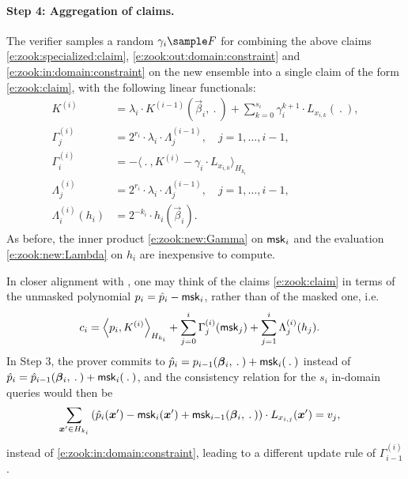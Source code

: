 \paragraph{Step 4: Aggregation of claims.}

The verifier samples a random $\gamma_i\sample F$ for combining the above claims \eqref{e:zook:specialized:claim}, \eqref{e:zook:out:domain:constraint} and \eqref{e:zook:in:domain:constraint} on the new ensemble into a single claim of the form \eqref{e:zook:claim}, with the following linear functionals:
\begin{align}
\label{e:zook:update:K}
K^{(i)} &=  \lambda_i\cdot K^{(i-1)}(\vec\beta_i,\:.\:) + \sum_{k=0}^{s_i} \gamma_i^{k+1} \cdot L_{x_{i,k}}(\:.\:),
\\\label{e:zook:update:Gamma}
\Gamma_{j}^{(i)}  &=  2^{r_i}\cdot\lambda_i\cdot \Lambda_j^{(i-1)}, \quad j=1,\ldots,i-1,
\\\label{e:zook:new:Gamma}
\Gamma_i^{(i)} &= - \langle \:.\:, K^{(i)} - \gamma_i\cdot L_{x_{i,0}} \rangle_{H_{k_i}}
\\\label{e:zook:update:Lambda}
\Lambda_{j}^{(i)}  
&=  2^{r_i}\cdot\lambda_i\cdot \Lambda_j^{(i-1)}, \quad j=1,\ldots, i-1,
\\\label{e:zook:new:Lambda}
\Lambda_i^{(i)}(h_i) & = 2^{-k_i}\cdot h_i(\vec \beta_i).
\end{align}
As before, the inner product \eqref{e:zook:new:Gamma} on $\mathsf{msk}_i$ and the evaluation \eqref{e:zook:new:Lambda} on $h_i$ are inexpensive to compute.


\begin{rem}
\label{rem:zook:pi:instead:pi:hat}
In closer alignment with \cite{cryptoeprint:2026/391}, one may  think of the claims \eqref{e:zook:claim} in terms of the unmasked polynomial $p_i = \hat p_i - \mathsf{msk}_i$, rather than of the masked one, i.e.
\begin{align*}
c_{i}  &= \left\langle p_{i}, K^{(i)} \right\rangle_{H_{k_{i}}} 
+ \sum_{j=0}^{i} \Gamma_j^{(i)}(\mathsf{msk}_j) + \sum_{j=1}^{i} \Lambda_{j}^{(i)} (h_{j}).
\end{align*}
In Step 3, the prover commits to $\hat p_i = p_{i-1}(\vec\beta_i,\:.\:) + \msk_i(\:.\:)$ instead of $\hat p_i = \hat p_{i-1}(\vec\beta_i,\:.\:) + \msk_i(\:.\:)$, and the consistency relation for the $s_i$ in-domain queries would then be 
\begin{align*}
\sum_{\vec x'\in H_{k_i}} \left(\hat p_i(\vec x') - \msk_{i}(\vec x') + \msk_{i-1}(\vec\beta_i, \:.\:) \right)\cdot L_{x_{i,j}}(\vec x') &= v_{j}, 
\end{align*}
instead of \eqref{e:zook:in:domain:constraint}, leading to a different update rule of $\Gamma_{i-1}^{(i)}$.
\end{rem}



